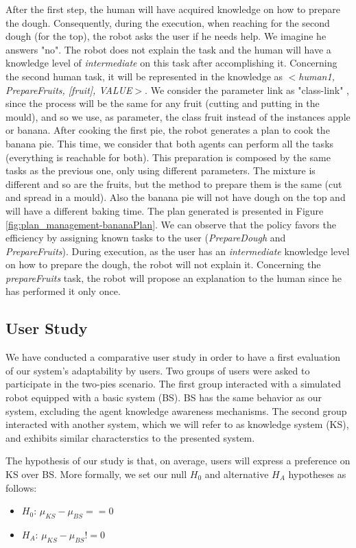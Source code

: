 After the first step, the human will have acquired knowledge on how to prepare the dough.
Consequently, during the execution, when reaching for the second dough (for the top), the robot asks the user if he needs help. We imagine he answers "no". The robot does not explain the task  and the human will have a knowledge level of  \textit{intermediate} on this task after accomplishing it. Concerning the second human task, it will be represented in the knowledge as \textit{$<$human1, PrepareFruits, [fruit], VALUE$>$}. We consider the parameter link as "class-link" , since the process will be the same for any fruit (cutting and putting in the mould), and so we use, as parameter, the class fruit instead of the instances apple or banana.
%
%
After cooking the first pie, the robot generates a plan to cook the banana pie. This time, we consider that both agents can perform all the tasks (everything is reachable for both). This preparation is composed by the same tasks as the previous one, only using different parameters. The  mixture is different and so are the fruits, but the method to prepare them is the same (cut and spread in a mould). Also the banana pie will not have dough on the top and will have a different baking time. The plan generated is presented in Figure \ref{fig:plan_management-bananaPlan}. We can observe that the policy favors the efficiency by assigning known tasks to the user (\textit{PrepareDough} and \textit{PrepareFruits}). During execution, as the user has an \textit{intermediate} knowledge level on how to prepare the dough, the robot will not explain it. Concerning the \textit{prepareFruits} task, the robot will propose an explanation to the human since he has performed it only once.


\subsection{User Study}
We have conducted a comparative user study in order to have a first evaluation of our system's adaptability by users. Two groups of users were asked to participate in the two-pies scenario. The first group interacted with a simulated robot equipped with a basic system (BS). BS has the same behavior as our system, excluding the agent knowledge awareness mechanisms. The second group interacted with another system, which we will refer to as knowledge system (KS), and exhibits similar characterstics to the presented system.

The hypothesis of our study is that, on average, users will express a preference on KS over BS. More formally, we set our null $H_0$ and alternative $H_A$ hypotheses as follows:
\begin{itemize}
\item $H_0$: $\mu_{KS}-\mu_{BS}==0$ 
\item $H_A$: $\mu_{KS}-\mu_{BS}!=0$  
\end{itemize}


